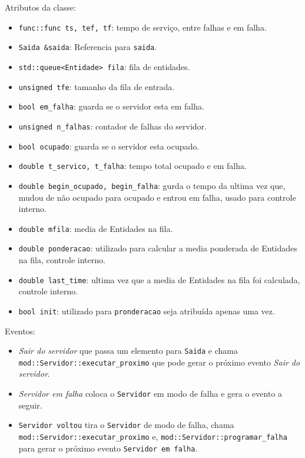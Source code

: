 \documentclass{article}
\begin{document}
\begin{itemize}
    Atributos da classe:
   \begin{itemize}
     \item \texttt{func::func ts, tef, tf}: tempo de serviço, entre falhas e em falha.
     \item \texttt{Saida \&saida}: Referencia para \texttt{saida}.
     \item \texttt{std::queue<Entidade> fila}: fila de entidades.
     \item \texttt{unsigned tfe}: tamanho da fila de entrada.
     \item \texttt{bool em\_falha}: guarda se o servidor esta em falha.
     \item \texttt{unsigned n\_falhas}: contador de falhas do servidor.
     \item \texttt{bool ocupado}: guarda se o servidor esta ocupado.
     \item \texttt{double t\_servico, t\_falha}: tempo total ocupado e em falha.
     \item \texttt{double begin\_ocupado, begin\_falha}: gurda o tempo da ultima vez que, 
       mudou de não ocupado para ocupado e entrou em falha, usado para controle interno.
     \item \texttt{double mfila}: media de Entidades na fila.
     \item \texttt{double ponderacao}: utilizado para calcular a media ponderada de
       Entidades na fila, controle interno.
     \item \texttt{double last\_time}: ultima vez que a media de Entidades na fila foi
       calculada, controle interno.
     \item \texttt{bool init}: utilizado para \texttt{pronderacao} seja atribuída apenas 
       uma vez.
   \end{itemize}

    Eventos:
    \begin{itemize}
      \item \textit{Sair do servidor} que passa um elemento para \texttt{Saida}
        e chama \\\texttt{mod::Servidor::executar\_proximo} que pode gerar o próximo 
        evento \textit{Sair do servidor}. 

      \item \textit{Servidor em falha} coloca o \texttt{Servidor} em modo de falha e
        gera o evento a seguir.

      \item \texttt{Servidor voltou} tira o \texttt{Servidor} de modo de falha, 
        chama \\\texttt{mod::Servidor::executar\_proximo} e, 
        \texttt{mod::Servidor::programar\_falha} para gerar o próximo evento
        \texttt{Servidor em falha}.
    \end{itemize}


\end{itemize}
\end{document}
